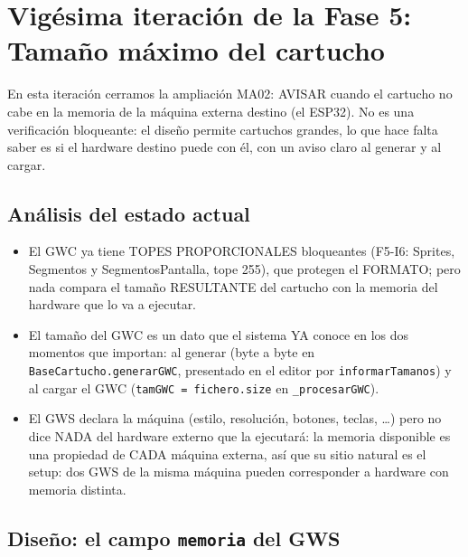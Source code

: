 \section{Vigésima iteración de la Fase 5: Tamaño máximo del cartucho}
\label{sec:F5I20}

En esta iteración cerramos la ampliación MA02: AVISAR cuando el cartucho no
cabe en la memoria de la máquina externa destino (el ESP32). No es una
verificación bloqueante: el diseño permite cartuchos grandes, lo que hace
falta saber es si el hardware destino puede con él, con un aviso claro al
generar y al cargar.

\subsection{Análisis del estado actual}
\label{sec:F5I20Analisis}

\begin{itemize}
	\item El GWC ya tiene TOPES PROPORCIONALES bloqueantes (F5-I6: Sprites,
	Segmentos y SegmentosPantalla, tope 255), que protegen el FORMATO; pero
	nada compara el tamaño RESULTANTE del cartucho con la memoria del
	hardware que lo va a ejecutar.
	\item El tamaño del GWC es un dato que el sistema YA conoce en los dos
	momentos que importan: al generar (byte a byte en
	\texttt{BaseCartucho.generarGWC}, presentado en el editor por
	\texttt{informarTamanos}) y al cargar el GWC
	(\texttt{tamGWC = fichero.size} en \texttt{\_procesarGWC}).
	\item El GWS declara la máquina (estilo, resolución, botones, teclas,
	\ldots) pero no dice NADA del hardware externo que la ejecutará: la
	memoria disponible es una propiedad de CADA máquina externa, así que su
	sitio natural es el setup: dos GWS de la misma máquina pueden
	corresponder a hardware con memoria distinta.
\end{itemize}

\subsection{Diseño: el campo \texttt{memoria} del GWS}
\label{sec:F5I20Diseno}


